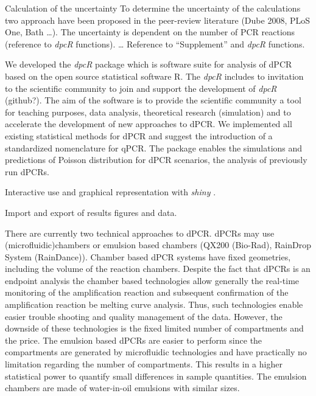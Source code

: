 \documentclass{bioinfo}
\begin{document}
Calculation of the uncertainty
To determine the uncertainty of the calculations two approach have been proposed 
in the peer-review literature (Dube 2008, PLoS One, Bath …). The uncertainty is 
dependent on the number of PCR reactions (reference to \textit{\textit{dpcR}} 
functions). … Reference to ``Supplement'' and \textit{dpcR} functions.

We developed the \textit{dpcR} package which is software suite for analysis of 
dPCR based on the open source statistical software R. The \textit{dpcR} includes 
to invitation to the scientific community to join and support the development of 
\textit{dpcR} (github?). The aim of the software is to provide the scientific 
community a tool for teaching purposes, data analysis, theoretical research 
(simulation) and to accelerate the development of new approaches to dPCR. We 
implemented all existing statistical methods for dPCR and suggest the 
introduction of a standardized nomenclature for qPCR. The package enables the 
simulations and predictions of Poisson distribution for dPCR scenarios, the 
analysis of previously run dPCRs.

Interactive use and graphical representation with \textit{shiny} \cite{shiny}.

Import and export of results figures and data.

There are currently two technical approaches to dPCR. dPCRs may use		%
(microfluidic)chambers or emulsion based chambers 
(QX200 \texttrademark (Bio-Rad), RainDrop \texttrademark System (RainDance)). 
Chamber based dPCR systems have fixed geometries, including the volume of the 
reaction chambers. Despite the fact that dPCRs is an endpoint analysis the 
chamber based technologies allow generally the real-time monitoring of the 
amplification reaction and subsequent confirmation of the amplification reaction 
be melting curve analysis. Thus, such technologies enable easier trouble 
shooting and quality management of the data. However, the downside of these 
technologies is the fixed limited number of compartments and the price. The 
emulsion based dPCRs are easier to perform since the compartments are generated 
by microfluidic technologies and have practically no limitation regarding the 
number of compartments. This results in a higher statistical power to quantify 
small differences in sample quantities. The emulsion chambers are made of 
water-in-oil emulsions with similar sizes.
\end{document}
